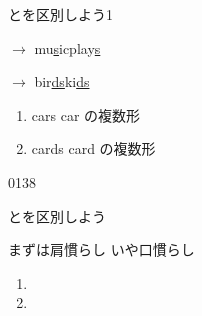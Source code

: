 \documentclass[aspectratio=169,xcolor={dvipsnames,table}]{beamer}
\begin{document}
\begin{frame}[plain]{とを区別しよう1}
\Large

 $\rightarrow$ \hspace{95pt}\pause{}mu\underline{s}ic\hspace{10pt}play\underline{s}

\pause

 $\rightarrow$ \hspace{80pt}\pause{}bir\underline{ds}\hspace{10pt}ki\underline{ds}

\vfill

\pause

 \begin{enumerate}
  \item cars \hfill{\scriptsize car の複数形}
  \item cards \hfill{\scriptsize card  の複数形} 

 \end{enumerate}

\hfill{\tiny 0138}\,{\scriptsize {}}
\end{frame}
\begin{frame}[plain]{とを区別しよう}

まずは肩慣らし\pause{} いや口慣らし\pause

\Large

\begin{enumerate}
 \item {}\pause
 \item {}
\end{enumerate}

\end{frame}
\end{document}
